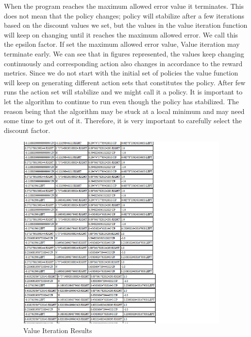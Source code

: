 When the program reaches the maximum allowed error value it terminates. This
does not mean that the policy changes; policy will stabilize after a few
iterations based on the discount values we set, but the values in the value
iteration function will keep on changing until it reaches the maximum allowed
error. We call this the epsilon factor. If set the maximum allowed error value,
Value iteration may terminate early.
 We can see that in figures
represented, the values keep changing continuously and corresponding action also
changes in accordance to the reward metrics. Since we do not start with the
initial set of policies the value function will keep on generating different
action sets that constitutes the policy. After few runs the action set will
stabilize and we might call it a policy. It is important to let the
algorithm to continue to run even though the policy has stabilized. The reason
being that the algorithm may be stuck at a local minimum and may need some time
to get out of it.  Therefore, it is very important to carefully select the
discount factor.

\begin{figure}[h!]
    \label{fig:ValueIterationResults2}
    \begin{center}
        \includegraphics[width=0.95\textwidth]{Figures/Planning_Figure_3.png}
        \caption{Value Iteration Results}
    \end{center}
\end{figure}

